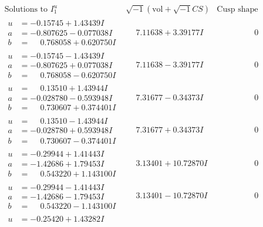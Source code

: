 \documentclass[1p]{elsarticle_modified}
\theoremstyle{definition}
\newcommand{\I}{\sqrt{-1}}
\begin{document}
$$\begin{array}{c|c|c}
\text{Solutions to }I^u_{1}& \I (\text{vol} + \sqrt{-1}CS) & \text{Cusp shape}\\
 \hline 
\begin{aligned}
u &= -0.15745 + 1.43439 I \\
a &= -0.807625 - 0.077038 I \\
b &= \phantom{-}0.768058 + 0.620750 I\end{aligned}
 & \phantom{-}7.11638 + 3.39177 I & \phantom{-0.000000 } 0 \\ \hline\begin{aligned}
u &= -0.15745 - 1.43439 I \\
a &= -0.807625 + 0.077038 I \\
b &= \phantom{-}0.768058 - 0.620750 I\end{aligned}
 & \phantom{-}7.11638 - 3.39177 I & \phantom{-0.000000 } 0 \\ \hline\begin{aligned}
u &= \phantom{-}0.13510 + 1.43944 I \\
a &= -0.028780 - 0.593948 I \\
b &= \phantom{-}0.730607 + 0.374401 I\end{aligned}
 & \phantom{-}7.31677 - 0.34373 I & \phantom{-0.000000 } 0 \\ \hline\begin{aligned}
u &= \phantom{-}0.13510 - 1.43944 I \\
a &= -0.028780 + 0.593948 I \\
b &= \phantom{-}0.730607 - 0.374401 I\end{aligned}
 & \phantom{-}7.31677 + 0.34373 I & \phantom{-0.000000 } 0 \\ \hline\begin{aligned}
u &= -0.29944 + 1.41443 I \\
a &= -1.42686 + 1.79453 I \\
b &= \phantom{-}0.543220 + 1.143100 I\end{aligned}
 & \phantom{-}3.13401 + 10.72870 I & \phantom{-0.000000 } 0 \\ \hline\begin{aligned}
u &= -0.29944 - 1.41443 I \\
a &= -1.42686 - 1.79453 I \\
b &= \phantom{-}0.543220 - 1.143100 I\end{aligned}
 & \phantom{-}3.13401 - 10.72870 I & \phantom{-0.000000 } 0 \\ \hline\begin{aligned}
u &= -0.25420 + 1.43282 I \\

\end{aligned}
\end{array}$$
\end{document}

